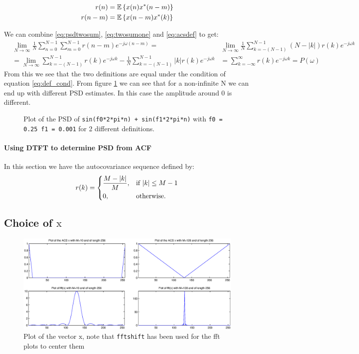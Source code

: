\documentclass[10pt,twoside,a4paper]{report}
\begin{document}
\begin{align}
r(n) &= \mathbb{E} \left\{x(n)x^*(n-m)\right\} \notag \\
r(n-m) &= \mathbb{E} \left\{x(n-m)x^*(k)\right\} \label{eq:acsdef}
\end{align}

We can combine \ref{eq:psdtwosum}, \ref{eq:twosumone} and \ref{eq:acsdef} to get:
\begin{align*}
& \lim\limits_{N\to\infty} \frac{1}{N} \sum_{n=0}^{N-1} \sum_{m=0}^{N-1} r(n-m) e^{-j\omega (n-m)}  =
& \lim\limits_{N\to\infty} \frac{1}{N}  \sum_{k=-(N-1)}^{N-1} (N-|k|) r(k) e^{-j\omega k} \\
&=   \lim\limits_{N\to\infty} \sum_{k=-(N-1)}^{N-1} r(k) e^{-j\omega k} -  \frac{1}{N}  \sum_{k=-(N-1)}^{N-1} |k| r(k) e^{-j\omega k} 
&= \sum_{k=-\infty}^{\infty} r(k) e^{-j\omega k}
=P(\omega)
\end{align*}
From this we see that the two definitions are equal under the condition of equation \ref{eq:def_cond}. From figure \ref{fig:eq_cond} we can see that for a non-infinite N we can end up with different PSD estimates. In this case the amplitude around 0 is different.

\begin{figure}[h!]
\centering
\resizebox{\textwidth}{!}{}
\caption{Plot of the PSD of \texttt{sin(f0*2*pi*n) + sin(f1*2*pi*n)} with \texttt{f0 = 0.25 f1 = 0.001} for 2 different definitions.} 
\label{fig:eq_cond}
\end{figure}

\paragraph{Using DTFT to determine PSD from ACF}
In this section we have the autocovariance sequence defined by:
\begin{equation}
    r(k)= 
\begin{dcases}
    \frac{M-|k|}{M},& \text{if } |k|\leq M - 1\\
    0,              & \text{otherwise.}
\end{dcases}
\end{equation}
\subsection{Choice of $\boldsymbol{\mathrm{x}}$}
\begin{figure}[h!]
\includegraphics[width=\textwidth]{cw1im/1a.eps}
\caption{Plot of the vector $\boldsymbol{\mathrm{x}}$, note that \texttt{fftshift} has been used for the fft plots to center them}
\label{fig:ex1b}
\end{figure}
\end{document}
